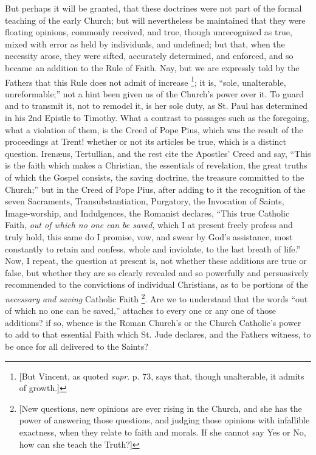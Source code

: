 But perhaps it will be granted, that these doctrines were not part
of the formal teaching of the early Church; but will nevertheless be
maintained that they were floating opinions, commonly received, and
true, though unrecognized as true, mixed with error as held by
individuals, and undefined; but that, when the necessity arose, they
were sifted, accurately determined, and enforced, and so became an
addition to the Rule of Faith. Nay, but we are expressly told by the
Fathers that this Rule does not admit of increase \footnote{[But Vincent, as quoted \emph{supr}. p. 73,
says that, though unalterable, it admits of growth.]}; it is, ``sole, unalterable, unreformable;'' not a hint
been given us of the Church's power over it. To guard and to transmit
it, not to remodel it, is her sole duty, as St. Paul has determined in
his 2nd Epistle to Timothy. What a contrast to passages such as the
foregoing, what a violation of them, is the Creed of Pope Pius, which
was the result of the proceedings at Trent! whether or not its
articles be true, which is a distinct question. Irenæus, Tertullian,
and the rest cite the Apostles' Creed and say, ``This is the faith
which makes a Christian, the essentials of revelation, the great
truths of which the Gospel consists, the saving doctrine, the treasure
committed to the Church;'' but in the Creed of Pope Pius, after
adding to it the recognition of the seven Sacraments,
Transubstantiation, Purgatory, the Invocation of Saints,
Image-worship, and Indulgences, the Romanist declares, ``This true
Catholic Faith, \emph{out of which no one can be saved}, which I at
present freely profess and truly hold, this same do I promise, vow,
and swear by God's assistance, most constantly to retain and confess,
whole and inviolate, to the last breath of life.'' Now, I repeat,
the question at present is, not whether these additions are true or
false, but whether they are so clearly revealed and so
powerfully and persuasively recommended to the convictions of
individual Christians, as to be portions of the \emph{necessary and
saving} Catholic Faith \footnote{[New questions, new opinions are ever rising
in the Church, and she has the power of answering those questions, and
judging those opinions with infallible exactness, when they relate to
faith and morals. If she cannot say Yes or No, how can she teach the
Truth?]}.
Are we to understand that the words ``out of which no one can be
saved,'' attaches to every one or any one of those additions? if
so, whence is the Roman Church's or the Church Catholic's power to add
to that essential Faith which St. Jude declares, and the Fathers
witness, to be once for all delivered to the Saints?


